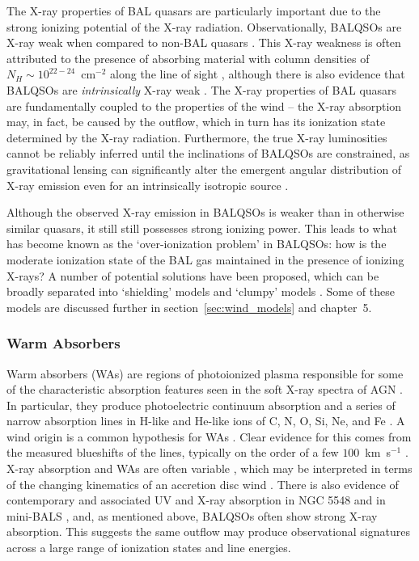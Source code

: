 The X-ray properties of BAL quasars are particularly important due
to the strong ionizing potential of the X-ray radiation. 
Observationally, BALQSOs are X-ray weak when compared to 
non-BAL quasars \citep{gibson2009}. 
This X-ray weakness is often attributed to the presence of absorbing material
with column densities of $N_H \sim 10^{22-24}$~cm$^{-2}$ along the line of sight
\citep{gallagher1999,gallagher2002,green2001,grupe2003,stalin2011},
although there is also evidence that BALQSOs are {\em intrinsically}
X-ray weak \citep{sabra2001,clavel2006,morabito2013}.
The X-ray properties of BAL quasars are fundamentally coupled to 
the properties of the wind -- the X-ray absorption may, in fact, be caused by 
the outflow, which in turn has its ionization state 
determined by the X-ray radiation. Furthermore, the true X-ray 
luminosities cannot be reliably inferred until the 
inclinations of BALQSOs are
constrained, as gravitational lensing can significantly alter the
emergent angular distribution of X-ray emission even for an intrinsically
isotropic source \citep{chen2013a, chen2013b}.

Although the observed X-ray emission in BALQSOs is weaker than in otherwise similar
quasars, it still still possesses strong ionizing power. This leads to what has become
known as the `over-ionization problem' in BALQSOs: how is the moderate 
ionization state of the BAL gas maintained in the presence of ionizing 
X-rays? A number of potential solutions have been proposed, which can be 
broadly separated into `shielding' models \citep{MCGV95,PK04} and `clumpy'
models \citep{dekool1995,hamann2013}. Some of these models are discussed
further in section~\ref{sec:wind_models} and chapter~5.

\subsubsection{Warm Absorbers}

Warm absorbers (WAs) are regions of photoionized plasma responsible for some
of the characteristic absorption features seen in the 
soft X-ray spectra of AGN \citep{reynolds1995}.
In particular, they produce photoelectric continuum absorption 
\citep[e.g.][]{halpern1984,cappi1996,kriss1996}
and a series of narrow absorption lines in H-like and He-like ions of 
C, N, O, Si, Ne, and Fe \citep{kaastra2000}.
A wind origin is a common hypothesis for WAs 
\citep[e.g.][]{krolikkriss2001}. Clear evidence for this 
comes from the measured blueshifts of the lines, typically on the order of 
a few $100$~km~s$^{-1}$ \citep[e.g.][]{kaastra2000}. X-ray absorption and WAs are often
variable \citep{fabian1994,otani1996}, which may be interpreted in terms of 
the changing kinematics of an accretion disc wind \citep{connolly2014}. 
There is also evidence of contemporary and associated UV and X-ray absorption 
in NGC 5548 \citep{kaastra2014} and in mini-BALS \citep{giustini2011},
and, as mentioned above, BALQSOs often show strong X-ray absorption. 
This suggests the same outflow may produce observational signatures  
across a large range of ionization states and line energies. 

